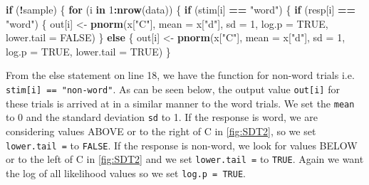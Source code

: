 \documentclass[]{book}
\newenvironment{Shaded}{\begin{snugshade}}{\end{snugshade}}
\newcommand{\ControlFlowTok}[1]{\textcolor[rgb]{0.13,0.29,0.53}{\textbf{#1}}}
\newcommand{\DataTypeTok}[1]{\textcolor[rgb]{0.13,0.29,0.53}{#1}}
\newcommand{\DecValTok}[1]{\textcolor[rgb]{0.00,0.00,0.81}{#1}}
\newcommand{\KeywordTok}[1]{\textcolor[rgb]{0.13,0.29,0.53}{\textbf{#1}}}
\newcommand{\NormalTok}[1]{#1}
\newcommand{\OperatorTok}[1]{\textcolor[rgb]{0.81,0.36,0.00}{\textbf{#1}}}
\newcommand{\OtherTok}[1]{\textcolor[rgb]{0.56,0.35,0.01}{#1}}
\newcommand{\StringTok}[1]{\textcolor[rgb]{0.31,0.60,0.02}{#1}}
\begin{document}
\begin{Shaded}
\begin{Highlighting}[numbers=left,,firstnumber=8,]
  \ControlFlowTok{if}\NormalTok{ (}\OperatorTok{!}\NormalTok{sample) \{}
    \ControlFlowTok{for}\NormalTok{ (i }\ControlFlowTok{in} \DecValTok{1}\OperatorTok{:}\KeywordTok{nrow}\NormalTok{(data)) \{}
      \ControlFlowTok{if}\NormalTok{ (stim[i] }\OperatorTok{==}\StringTok{ "word"}\NormalTok{) \{}
        \ControlFlowTok{if}\NormalTok{ (resp[i] }\OperatorTok{==}\StringTok{ "word"}\NormalTok{) \{}
\NormalTok{          out[i] <-}\StringTok{ }\KeywordTok{pnorm}\NormalTok{(x[}\StringTok{"C"}\NormalTok{], }\DataTypeTok{mean =}\NormalTok{ x[}\StringTok{"d"}\NormalTok{], }\DataTypeTok{sd =} \DecValTok{1}\NormalTok{, }
                         \DataTypeTok{log.p =} \OtherTok{TRUE}\NormalTok{, }\DataTypeTok{lower.tail =} \OtherTok{FALSE}\NormalTok{)}
\NormalTok{    \} }\ControlFlowTok{else}\NormalTok{ \{}
\NormalTok{      out[i] <-}\StringTok{ }\KeywordTok{pnorm}\NormalTok{(x[}\StringTok{"C"}\NormalTok{], }\DataTypeTok{mean =}\NormalTok{ x[}\StringTok{"d"}\NormalTok{], }\DataTypeTok{sd =} \DecValTok{1}\NormalTok{, }
                     \DataTypeTok{log.p =} \OtherTok{TRUE}\NormalTok{, }\DataTypeTok{lower.tail =} \OtherTok{TRUE}\NormalTok{)}
\NormalTok{      \}}
\end{Highlighting}
\end{Shaded}

From the else statement on line 18, we have the function for non-word trials i.e. \texttt{stim{[}i{]}\ ==\ "non-word"}. As can be seen below, the output value \texttt{out{[}i{]}} for these trials is arrived at in a similar manner to the word trials. We set the \texttt{mean} to 0 and the standard deviation \texttt{sd} to 1. If the response is word, we are considering values ABOVE or to the right of C in \ref{fig:SDT2}, so we set \texttt{lower.tail\ =} to \texttt{FALSE}. If the response is non-word, we look for values BELOW or to the left of C in \ref{fig:SDT2} and we set \texttt{lower.tail\ =} to \texttt{TRUE}. Again we want the log of all likelihood values so we set \texttt{log.p\ =\ TRUE}.
\end{document}
